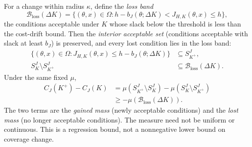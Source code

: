 \begin{theorem}
\label{thm:stage2_cost_regression}
For a change within radius $\kappa$, define the \emph{loss band}
\begin{equation}
\label{eq:stage2_loss_band}
 \mathcal B_{\mathrm{loss}}(\Delta K)
 =\{(\theta,x)\in\Omega:
       h-b_J(\theta;\Delta K)<J_{H,K}(\theta,x)\le h\},
\end{equation}
the conditions acceptable under $K$ whose slack below the threshold is
less than the cost-drift bound. Then the \emph{interior acceptable set}
(conditions acceptable with slack at least $b_J$) is preserved, and every
lost condition lies in the loss band:
\begin{align}
\label{eq:stage2_interior_preservation}
 \{(\theta,x)\in\Omega:J_{H,K}(\theta,x)\le h-b_J(\theta;\Delta K)\}
 &\subseteq S_{K^+}^J,\\
\label{eq:stage2_losses}
 S_K^J\setminus S_{K^+}^J&\subseteq\mathcal B_{\mathrm{loss}}(\Delta K).
\end{align}
Under the same fixed $\mu$,
\begin{align}
\label{eq:stage2_coverage_accounting}
 C_J(K^+)-C_J(K)
 &=\mu(S_{K^+}^J\setminus S_K^J)-\mu(S_K^J\setminus S_{K^+}^J)\\
 &\ge-\mu(\mathcal B_{\mathrm{loss}}(\Delta K)).\nonumber
\end{align}
The two terms are the \emph{gained mass} (newly acceptable conditions) and
the \emph{lost mass} (no longer acceptable conditions).
The measure need not be uniform or continuous. This is a regression bound,
not a nonnegative lower bound on coverage change.
\end{theorem}

